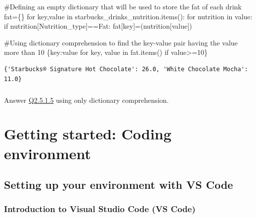 \documentclass[
  letterpaper,
  DIV=11,
  numbers=noendperiod]{scrreprt}
\newenvironment{Shaded}{\begin{snugshade}}{\end{snugshade}}
\newcommand{\CommentTok}[1]{\textcolor[rgb]{0.37,0.37,0.37}{#1}}
\newcommand{\ControlFlowTok}[1]{\textcolor[rgb]{0.00,0.23,0.31}{#1}}
\newcommand{\DecValTok}[1]{\textcolor[rgb]{0.68,0.00,0.00}{#1}}
\newcommand{\KeywordTok}[1]{\textcolor[rgb]{0.00,0.23,0.31}{#1}}
\newcommand{\NormalTok}[1]{\textcolor[rgb]{0.00,0.23,0.31}{#1}}
\newcommand{\OperatorTok}[1]{\textcolor[rgb]{0.37,0.37,0.37}{#1}}
\newcommand{\StringTok}[1]{\textcolor[rgb]{0.13,0.47,0.30}{#1}}
\begin{document}
\begin{Shaded}
\begin{Highlighting}[]
\CommentTok{\#Defining an empty dictionary that will be used to store the fat of each drink}
\NormalTok{fat}\OperatorTok{=}\NormalTok{\{\}}
\ControlFlowTok{for}\NormalTok{ key,value }\KeywordTok{in}\NormalTok{ starbucks\_drinks\_nutrition.items():}
    \ControlFlowTok{for}\NormalTok{ nutrition }\KeywordTok{in}\NormalTok{ value:        }
        \ControlFlowTok{if}\NormalTok{ nutrition[}\StringTok{\textquotesingle{}Nutrition\_type\textquotesingle{}}\NormalTok{]}\OperatorTok{==}\StringTok{\textquotesingle{}Fat\textquotesingle{}}\NormalTok{:}
\NormalTok{            fat[key]}\OperatorTok{=}\NormalTok{(nutrition[}\StringTok{\textquotesingle{}value\textquotesingle{}}\NormalTok{])}
            
\CommentTok{\#Using dictionary comprehension to find the key{-}value pair having the value more than 10}
\NormalTok{\{key:value }\ControlFlowTok{for}\NormalTok{ key, value }\KeywordTok{in}\NormalTok{ fat.items() }\ControlFlowTok{if}\NormalTok{ value}\OperatorTok{\textgreater{}=}\DecValTok{10}\NormalTok{\}}
\end{Highlighting}
\end{Shaded}

\begin{verbatim}
{'Starbucks® Signature Hot Chocolate': 26.0, 'White Chocolate Mocha': 11.0}
\end{verbatim}

\hypertarget{section-16}{%
\subsubsection{}\label{section-16}}

Answer
\href{https://nustat.github.io/DataScience_Intro_python/data_structures.html\#section-14}{Q2.5.1.5}
using only dictionary comprehension.

\part{Getting started: Coding environment}

\hypertarget{setting-up-your-environment-with-vs-code}{%
\chapter{Setting up your environment with VS
Code}\label{setting-up-your-environment-with-vs-code}}

\hypertarget{introduction-to-visual-studio-code-vs-code}{%
\section{Introduction to Visual Studio Code (VS
Code)}\label{introduction-to-visual-studio-code-vs-code}}
\end{document}
